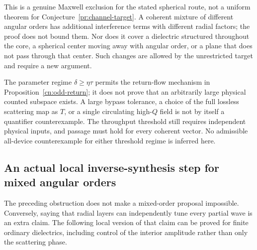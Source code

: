\begin{remark}
\label{cn:scope}
This is a genuine Maxwell exclusion for the stated spherical route,
not a uniform theorem for Conjecture~\ref{pr:channel-target}.
A coherent mixture of different angular orders has additional
interference terms with different radial factors; the proof does not
bound them.  Nor does it cover a dielectric structured throughout the
core, a spherical center moving away with angular order, or a plane
that does not pass through that center.  Such changes are allowed by
the unrestricted target and require a new argument.

The parameter regime $\delta\geq\eta\tau$ permits the return-flow
mechanism in Proposition~\ref{cn:odd-return}; it does not prove that an
arbitrarily large physical counted subspace exists.  A large bypass
tolerance, a choice of the full lossless scattering map as $T$, or a
single circulating high-$Q$ field is not by itself a quantifier
counterexample.  The throughput threshold still requires independent
physical inputs, and passage must hold for every coherent vector.
No admissible all-device counterexample for either threshold regime
is inferred here.
\end{remark}

\subsection{An actual local inverse-synthesis step for mixed angular orders}

The preceding obstruction does not make a mixed-order proposal
impossible.  Conversely, saying that radial layers can independently
tune every partial wave is an extra claim.  The following local version
of that claim can be proved for finite ordinary dielectrics, including
control of the interior amplitude rather than only the scattering phase.

